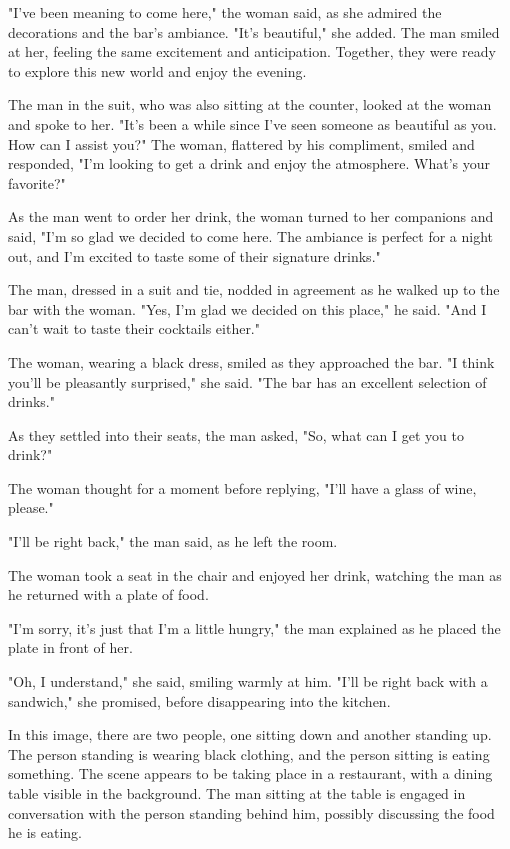 \documentclass[smalldemyvopaper,11pt,twoside,onecolumn,openright,extrafontsizes]{memoir}
\begin{document}
"I've been meaning to come here," the woman said, as she admired the decorations and the bar's ambiance. "It's beautiful," she added. The man smiled at her, feeling the same excitement and anticipation. Together, they were ready to explore this new world and enjoy the evening.\par
The man in the suit, who was also sitting at the counter, looked at the woman and spoke to her. "It's been a while since I've seen someone as beautiful as you. How can I assist you?" The woman, flattered by his compliment, smiled and responded, "I'm looking to get a drink and enjoy the atmosphere. What's your favorite?"\par
As the man went to order her drink, the woman turned to her companions and said, "I'm so glad we decided to come here. The ambiance is perfect for a night out, and I'm excited to taste some of their signature drinks."\par
The man, dressed in a suit and tie, nodded in agreement as he walked up to the bar with the woman. "Yes, I'm glad we decided on this place," he said. "And I can't wait to taste their cocktails either."\par
The woman, wearing a black dress, smiled as they approached the bar. "I think you'll be pleasantly surprised," she said. "The bar has an excellent selection of drinks."\par
As they settled into their seats, the man asked, "So, what can I get you to drink?"\par
The woman thought for a moment before replying, "I'll have a glass of wine, please."\par
"I'll be right back," the man said, as he left the room.\par
The woman took a seat in the chair and enjoyed her drink, watching the man as he returned with a plate of food.\par
"I'm sorry, it's just that I'm a little hungry," the man explained as he placed the plate in front of her.\par
"Oh, I understand," she said, smiling warmly at him. "I'll be right back with a sandwich," she promised, before disappearing into the kitchen.\par
In this image, there are two people, one sitting down and another standing up. The person standing is wearing black clothing, and the person sitting is eating something. The scene appears to be taking place in a restaurant, with a dining table visible in the background. The man sitting at the table is engaged in conversation with the person standing behind him, possibly discussing the food he is eating.\par
\end{document}
